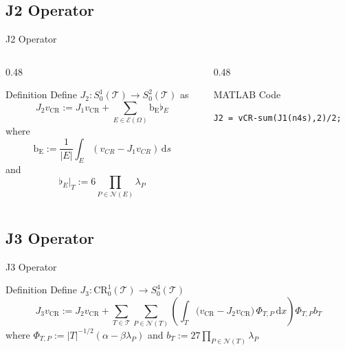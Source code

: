 \documentclass{beamer}					%
\newcommand{\vCR}{v_{\mathrm{CR}}}
\newcommand{\dx}{\,\mathrm{d}x}
\begin{document}
\subsection{J2 Operator}
\begin{frame}[fragile]{J2 Operator}

\begin{columns}[T]
\begin{column}{0.48\textwidth}
\begin{block}{Definition}
Define \(
J_2 : S^1_0(\mathcal{T}) \to S^2_0(\mathcal{T})\)
as
\[
J_2 \vCR := J_1 \vCR + \sum_{E \in \mathcal{E}(\Omega)} \mathrm{b_E}\flat_E
\]
where \[\mathrm{b_E} := \frac{1}{|E|}\int_{E} \left( v_{CR} - J_{1} v_{CR} \right)\, \mathrm{d}s\] and \[\flat_E|_T := 6 \prod_{P \in \mathcal{N}(E)} \lambda_P \]
\end{block}
\end{column}

\begin{column}{0.48\textwidth}

\begin{block}{ MATLAB Code}
\footnotesize
\begin{verbatim}
J2 = vCR-sum(J1(n4s),2)/2;
\end{verbatim}
\end{block}
\end{column}
\end{columns}
\end{frame}
\subsection{J3 Operator}
\begin{frame}[fragile]{J3 Operator}
\begin{block}{Definition}
Define \(
J_3 : \mathrm{CR}^1_0(\mathcal{T}) \to S^4_0(\mathcal{T})\)
\[
J_3 \vCR := J_2 \vCR
+ \sum_{T \in \mathcal{T}} \sum_{P \in \mathcal{N}(T)}
\left(
  \int_T \bigl( \vCR - J_2 \vCR \bigr)\, \Phi_{T,P} \dx
\right)
\Phi_{T,P} b_T
\]
where \(\Phi_{T,P} := |T|^{-1/2} (\alpha - \beta \lambda_P)\) and \(b_T := 27\prod_{P \in \mathcal{N}(T)} \lambda_P \)
\end{block}
\end{frame}
\end{document}

